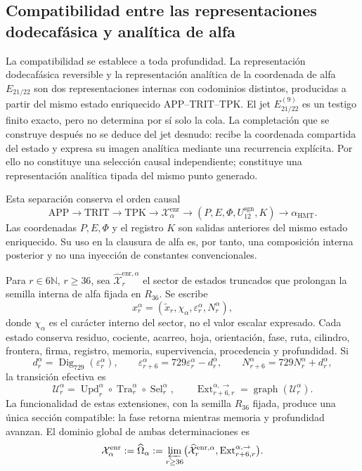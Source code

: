\subsection{Compatibilidad entre las representaciones dodecafásica y analítica de alfa}
\label{subsec:alpha-limite-dos-vias}

La compatibilidad se establece a toda profundidad. La representación
dodecafásica reversible y la representación analítica de la
coordenada de alfa
\(E_{21/22}\) son dos representaciones internas con codominios distintos,
producidas a partir del mismo estado enriquecido APP--TRIT--TPK. El jet
\(E_{21/22}^{(9)}\) es un testigo finito exacto, pero no determina por sí solo
la cola. La completación que se construye después no se deduce del jet
desnudo: recibe la coordenada compartida del estado y expresa su imagen
analítica mediante una recurrencia explícita. Por ello no constituye una
selección causal independiente; constituye una representación analítica
tipada del mismo punto generado.

Esta separación conserva el orden causal
\[
 \mathrm{APP}\longrightarrow\mathrm{TRIT}\longrightarrow\mathrm{TPK}
 \longrightarrow\mathcal X_{\alpha}^{\mathrm{enr}}
 \longrightarrow (P,E,\Phi,U_{12}^{\mathrm{sgn}},K)
 \longrightarrow\alpha_{\mathrm{HMT}}.
\]
Las coordenadas \(P,E,\Phi\) y el registro \(K\) son salidas anteriores del
mismo estado enriquecido. Su uso en la clausura de alfa es, por tanto, una
composición interna posterior y no una inyección de constantes
convencionales.

Para \(r\in6\mathbb N\), \(r\ge36\), sea
\(\widehat{\mathcal X}^{\mathrm{enr},\alpha}_r\) el sector de estados
truncados que prolongan la semilla interna de alfa fijada en \(R_{36}\). Se
escribe
\[
 x_r^\alpha=(\widetilde x_r,\chi_\alpha,
              \varepsilon_r^\alpha,N_r^\alpha),
\]
donde \(\chi_\alpha\) es el carácter interno del sector, no el valor escalar
expresado. Cada estado conserva residuo, cociente, acarreo, hoja, orientación,
fase, ruta, cilindro, frontera, firma, registro, memoria, supervivencia,
procedencia y profundidad. Si
\[
 d_r^\alpha=\operatorname{Dig}_{729}(\varepsilon_r^\alpha),\qquad
 \varepsilon_{r+6}^\alpha=729\varepsilon_r^\alpha-d_r^\alpha,
 \qquad N_{r+6}^\alpha=729N_r^\alpha+d_r^\alpha,
\]
la transición efectiva es
\[
 \mathcal U_r^\alpha=
 \operatorname{Upd}_r^\alpha\circ
 \operatorname{Tra}_r^\alpha\circ
 \operatorname{Sel}_r^\alpha,
 \qquad
 \operatorname{Ext}^{\alpha,\to}_{r+6,r}
 =\operatorname{graph}(\mathcal U_r^\alpha).
\]
La funcionalidad de estas extensiones, con la semilla \(R_{36}\) fijada,
produce una única sección compatible: la fase retorna mientras memoria y
profundidad avanzan. El dominio global de ambas determinaciones es
\begin{equation}
 \mathcal X_\alpha^{\mathrm{enr}}:=\widehat\Omega_\alpha
 :=\varprojlim_{r\ge36}
 \bigl(\widehat{\mathcal X}^{\mathrm{enr},\alpha}_r,
       \operatorname{Ext}^{\alpha,\to}_{r+6,r}\bigr).
 \label{eq:alpha-dominio-enriquecido-completo}
\end{equation}

